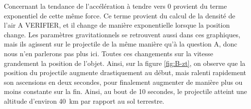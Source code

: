 \documentclass[a4paper,12pt,twoside]{article}
\begin{document}
Concernant la tendance de l'accélération à tendre vers 0 provient du terme exponentiel de cette même force. Ce terme provient du calcul de la densité de l'air A VERIFIER, et il change de manière exponentielle lorsque la position change. Les paramètres gravitationnels se retrouvent aussi dans ces graphiques, mais ils agissent sur le projectile de la même manière qu'à la question A, donc nous n'en parlerons pas plus ici.
Toutes ces changements sur la vitesse grandement la position de l'objet. Ainsi, sur la figure \ref{fig:B-zt}, on observe que la position du projectile augmente drastiquement au début, mais ralenti rapidement son ascensions en deux secondes, pour finalement augmenter de manière plus ou moins constante sur la fin. Ainsi, au bout de 10 secondes, le projectile atteint une altitude d'environ \SI{40}{\kilo\meter} par rapport au sol terrestre.\\
\end{document}
